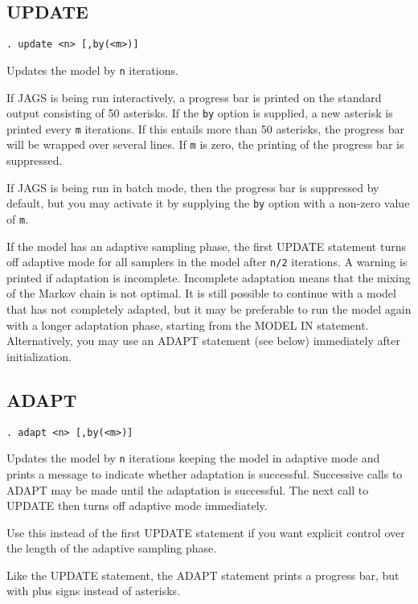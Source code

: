 \documentclass[11pt, a4paper, titlepage]{report}
\begin{document}
\subsection{UPDATE}

\begin{verbatim}
. update <n> [,by(<m>)]
\end{verbatim}
Updates the model by \texttt{n} iterations. 

If JAGS is being run interactively, a progress bar is printed on the
standard output consisting of 50 asterisks. If the \texttt{by} option
is supplied, a new asterisk is printed every \texttt{m} iterations. If
this entails more than 50 asterisks, the progress bar will be wrapped
over several lines.  If \texttt{m} is zero, the printing of the
progress bar is suppressed.

If JAGS is being run in batch mode, then the progress bar is
suppressed by default, but you may activate it by supplying the
\texttt{by} option with a non-zero value of \texttt{m}.

If the model has an adaptive sampling phase, the first UPDATE
statement turns off adaptive mode for all samplers in the model after
\texttt{n/2} iterations. A warning is printed if adaptation is
incomplete. Incomplete adaptation means that the mixing of the Markov
chain is not optimal. It is still possible to continue with a model
that has not completely adapted, but it may be preferable to run the
model again with a longer adaptation phase, starting from the MODEL IN
statement. Alternatively, you may use an ADAPT statement (see below)
immediately after initialization.

\subsection{ADAPT}
\label{section:adapt}

\begin{verbatim}
. adapt <n> [,by(<m>)]
\end{verbatim}
Updates the model by \texttt{n} iterations keeping the model in
adaptive mode and prints a message to indicate whether adaptation is
successful.  Successive calls to ADAPT may be made until the
adaptation is successful. The next call to UPDATE then turns off
adaptive mode immediately.

Use this instead of the first UPDATE statement if you want explicit
control over the length of the adaptive sampling phase.

Like the UPDATE statement, the ADAPT statement prints a progress
bar, but with plus signs instead of asterisks.
\end{document}
